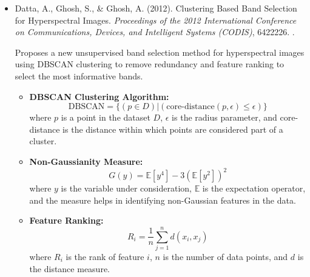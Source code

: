 \documentclass[10pt,svgnames,fragile]{beamer}
\begin{document}
\begin{frame}{}
\tiny
\begin{itemize}

    \item Datta, A., Ghosh, S., & Ghosh, A. (2012). Clustering Based Band Selection for Hyperspectral Images. \textit{Proceedings of the 2012 International Conference on Communications, Devices, and Intelligent Systems (CODIS)}, 6422226. \href{https://doi.org/10.1109/CODIS.2012.6422226}{\color{blue}{DOI: 10.1109/CODIS.2012.6422226}}. \cite{dattaClusteringBasedBand2012}
    
    {\color{gray}Proposes a new unsupervised band selection method for hyperspectral images using DBSCAN clustering to remove redundancy and feature ranking to select the most informative bands.}
    
    \begin{itemize} \tiny
    \item \textbf{DBSCAN Clustering Algorithm:}
    \[
    \text{DBSCAN} = \{ (p \in D) | (\text{core-distance}(p, \epsilon) \leq \epsilon) \}
    \]
    where \( p \) is a point in the dataset \( D \), \( \epsilon \) is the radius parameter, and core-distance is the distance within which points are considered part of a cluster.

    \item \textbf{Non-Gaussianity Measure:}
    \[
    G(y) = \mathbb{E}\left[ y^4 \right] - 3 \left( \mathbb{E}\left[ y^2 \right] \right)^2
    \]
    where \( y \) is the variable under consideration, \( \mathbb{E} \) is the expectation operator, and the measure helps in identifying non-Gaussian features in the data.

    \item \textbf{Feature Ranking:}
    \[
    R_i = \frac{1}{n} \sum_{j=1}^{n} d(x_i, x_j)
    \]
    where \( R_i \) is the rank of feature \( i \), \( n \) is the number of data points, and \( d \) is the distance measure.
\end{itemize}

    
\end{itemize}
\end{frame}
\end{document}
